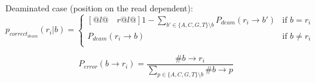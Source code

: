 \documentclass[a4paper,12pt]{article}
\begin{document}
\noindent  Deaminated case (position on the read dependent):
\begin{equation}
  p_{correct_{deam}}(r_i|b)   = \begin{cases}[@{}l@{\quad}r@{}l@{}]
    1-\sum\limits_{b' \in \{ A,C,G,T \} \setminus b}   P_{deam}(r_i \to b')  &  \text{if }  b = r_i    \\
    P_{deam}(r_i \to b) &  \text{if }  b \ne r_i    \\
  \end{cases}
\end{equation} 


\begin{equation}
  P_{error}(  b \to r_i )  = \frac { \# b \to r_i } { \sum\limits_{p \in \{ A,C,G,T \} \setminus b } \# b \to p }
\end{equation}




%
%
%
%
%
%
%
%
%
\end{document}
